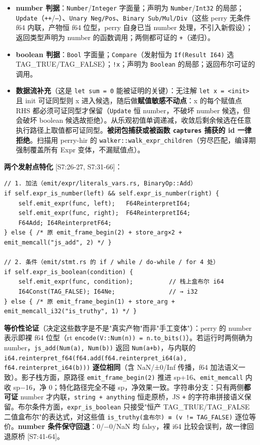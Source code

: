 \documentclass[11pt, a4paper]{article}
\begin{document}
\begin{itemize}
\item \textbf{number 判据}：\texttt{Number}/\texttt{Integer} 字面量；声明为 \texttt{Number}/\texttt{Int32} 的局部；\texttt{Update}（\texttt{++}/\texttt{--}）、\texttt{Unary Neg/Pos}、\texttt{Binary Sub/Mul/Div}（这些 perry 无条件 f64 内联，产物恒 f64 位型，perry 自身已当 number 处理，不引入新假设）；返回类型声明为 number 的函数调用；两侧都可证的 \texttt{+}（递归）。
\item \textbf{boolean 判据}：\texttt{Bool} 字面量；\texttt{Compare}（发射恒为 \texttt{If(Result I64)} 选 TAG\_TRUE/TAG\_FALSE）；\texttt{!x}；声明为 \texttt{Boolean} 的局部；返回布尔可证的调用。
\item \textbf{数据流补充}（这是 \texttt{let sum = 0} 能被证明的关键）：无注解 \texttt{let x = <init>} 且 init 可证同型则 x 进入候选，随后做\textbf{赋值敏感不动点}：x 的每个赋值点 RHS 都必须可证同型才保留（\texttt{Update} 恒 number，不破坏 number 候选，但会破坏 boolean 候选故拒绝）。从乐观初值单调递减，收敛后剩余候选在任意执行路径上取值都可证同型。\textbf{被闭包捕获或被函数 \texttt{captures} 捕获的 id 一律拒绝}。扫描用 perry-hir 的 \texttt{walker::walk\_expr\_children}（穷尽匹配，编译期强制覆盖所有 Expr 变体，不漏赋值点）。
\end{itemize}

\textbf{两个发射点特化} [S7:26-27, S7:31-66]：


\begin{verbatim}
// 1. 加法（emit/expr/literals_vars.rs, BinaryOp::Add）
if self.expr_is_number(left) && self.expr_is_number(right) {
    self.emit_expr(func, left);   F64ReinterpretI64;
    self.emit_expr(func, right);  F64ReinterpretI64;
    F64Add; I64ReinterpretF64;
} else { /* 原 emit_frame_begin(2) + store_arg×2 + emit_memcall("js_add", 2) */ }

// 2. 条件（emit/stmt.rs 的 if / while / do-while / for 4 处）
if self.expr_is_boolean(condition) {
    self.emit_expr(func, condition);          // 栈上盒布尔 i64
    I64Const(TAG_FALSE); I64Ne;               // → i32
} else { /* 原 emit_frame_begin(1) + store_arg + emit_memcall_i32("is_truthy", 1) */ }
\end{verbatim}

\textbf{等价性论证}（决定这些数字是不是"真实产物"而非"手工变体"）：perry 的 number 表示即裸 f64 位型（rt \texttt{encode(V::Num(n)) = n.to\_bits()}）。若运行时两侧确为 number，\texttt{js\_add(Num(a), Num(b))} 返回 \texttt{Num(a+b)}，与内联的 \texttt{i64.reinterpret\_f64(f64.add(f64.reinterpret\_i64(a), f64.reinterpret\_i64(b)))} \textbf{逐位相同}（含 NaN/±0/Inf 传播，f64 加法语义一致）。影子栈方面，原路径 \texttt{emit\_frame\_begin(2)} 推进 sp+16、\texttt{emit\_memcall} 内收 sp−16，净 0；特化路径完全不碰 sp，净效果一致。字符串分支：只有两侧\textbf{都可证} number 才内联，\texttt{string + anything} 恒走原桥，JS \texttt{+} 的字符串拼接语义保留。布尔条件方面，\texttt{expr\_is\_boolean} 只接受"恒产 TAG\_TRUE/TAG\_FALSE 二值盒布尔"的表达式，对这些值 \texttt{is\_truthy(盒布尔) ≡ (v != TAG\_FALSE)} 逐位等价。\textbf{number 条件保守回退}：0/−0/NaN 均 falsy，裸 i64 比较会误判，故一律回退原桥 [S7:41-64]。
\end{document}
